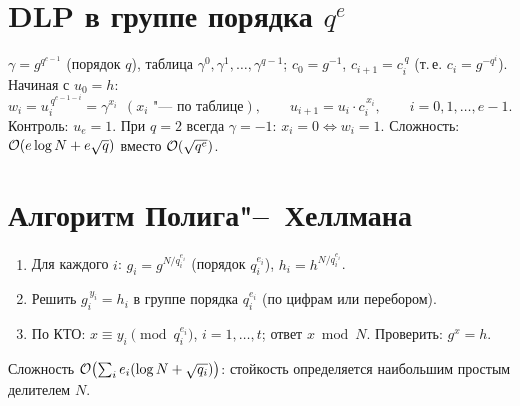 \documentclass{ca-handout}
\begin{document}
\section{DLP в группе порядка $q^e$}
\begin{reminder}[title={Цифры логарифма: $\ord g = q^e$, $x = x_0 + x_1 q + \cdots + x_{e-1} q^{e-1}$}]
$\gamma = g^{q^{e-1}}$ (порядок $q$), таблица $\gamma^0, \gamma^1, \dots, \gamma^{q-1}$;
$c_0 = g^{-1}$, $c_{i+1} = c_i^{\,q}$ (т.\,е. $c_i = g^{-q^i}$). Начиная с $u_0 = h$:
\[
  w_i = u_i^{\,q^{e-1-i}} = \gamma^{x_i}\ \ (\text{$x_i$ "--- по таблице}), \qquad
  u_{i+1} = u_i \cdot c_i^{\,x_i}, \qquad i = 0, 1, \dots, e - 1.
\]
Контроль: $u_e = 1$. При $q = 2$ всегда $\gamma = -1$: $x_i = 0 \iff w_i = 1$.
Сложность: $\mathcal{O}(e \log N + e \sqrt q)$ вместо $\mathcal{O}(\sqrt{q^e})$.
\end{reminder}

\section{Алгоритм Полига"--~Хеллмана}
\begin{reminder}[title={$\ord g = N = q_1^{e_1} \cdots q_t^{e_t}$, \ $h \in \langle g \rangle$}]
\begin{enumerate}
  \item Для каждого $i$: $g_i = g^{N/q_i^{e_i}}$ (порядок $q_i^{e_i}$), $h_i = h^{N/q_i^{e_i}}$.
  \item Решить $g_i^{\,y_i} = h_i$ в группе порядка $q_i^{e_i}$ (по цифрам или перебором).
  \item По КТО: $x \equiv y_i \pmod{q_i^{e_i}}$, $i = 1, \dots, t$; ответ $x \bmod N$.
        Проверить: $g^x = h$.
\end{enumerate}
Сложность $\mathcal{O}\bigl(\sum_i e_i (\log N + \sqrt{q_i})\bigr)$: стойкость определяется наибольшим
простым делителем $N$.
\end{reminder}
\end{document}
